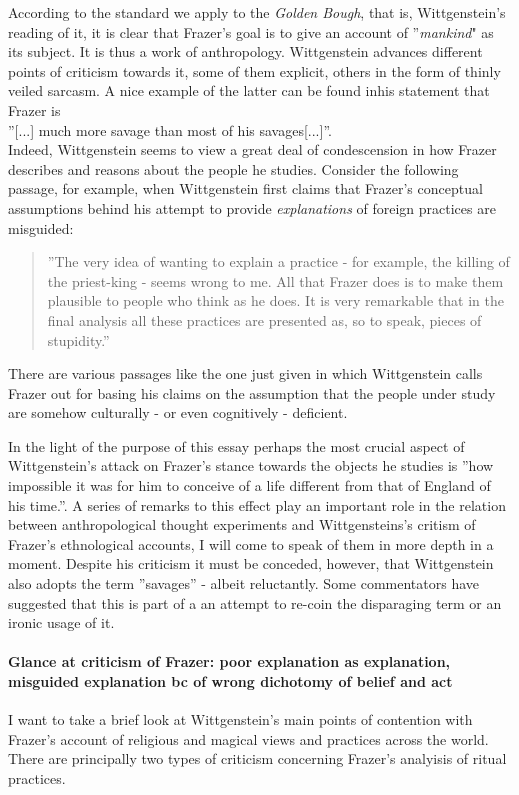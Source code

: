 \documentclass{article}
\begin{document}
According to the standard we apply to the \textit{Golden Bough}, that is, Wittgenstein's reading of it, it is clear that Frazer's goal is to give an account of ''\textit{mankind}" as its subject. It is thus a work of anthropology. Wittgenstein advances different points of criticism towards it, some of them explicit, others in the form of thinly veiled sarcasm. A nice example of the latter can be found inhis statement that Frazer is \\
''[...] much more savage than most of his savages[...]''.\\ %
 Indeed, Wittgenstein seems to view a great deal of condescension in how Frazer describes and reasons about the people he studies. Consider the following passage, for example, when Wittgenstein first claims that Frazer's conceptual assumptions behind his attempt to provide \textit{explanations} of foreign practices are misguided:\\
 \begin{quote}
 ''The very idea of wanting to explain a practice - for example, the killing of the priest-king - seems wrong to me. All that Frazer does is to make them plausible to people who think as he does. It is very remarkable that in the final analysis all these practices are presented as, so to speak, pieces of stupidity.''\\ %
 \end{quote}
 There are various passages like the one just given in which Wittgenstein calls Frazer out for basing his claims on the assumption that the people under study are somehow culturally - or even cognitively - deficient.
 
In the light of the purpose of this essay perhaps the most crucial aspect of Wittgenstein's attack on Frazer's stance towards the objects he studies is ''how impossible it was for him to conceive of a life different from that of England of his time.''. A series of remarks to this effect play an important role in the relation between anthropological thought experiments and Wittgensteins's critism of Frazer's ethnological accounts, I will come to speak of them in more depth in a moment.
 Despite his criticism it must be conceded, however, that Wittgenstein also adopts the term ''savages'' - albeit reluctantly. Some commentators have suggested that this is part of a an attempt to re-coin the disparaging term or an ironic usage of it. %
 
 
\paragraph{Glance at criticism of Frazer: poor explanation as explanation, misguided explanation bc of wrong dichotomy of belief and act}
I want to take a brief look at Wittgenstein's main points of contention with Frazer's account of religious and magical views and practices across the world. There are principally two types of criticism concerning Frazer's analyisis of ritual practices. 
\end{document}

